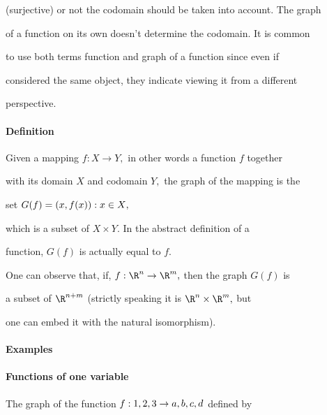 (surjective) or not the codomain should be taken into account. The graph

of a function on its own doesn't determine the codomain. It is common

to use both terms function and graph of a function since even if

considered the same object, they indicate viewing it from a different

perspective.






\paragraph{Definition}



Given a mapping $f : X \to Y,$ in other words a function $f$ together

with its domain $X$ and codomain $Y,$ the graph of the mapping is the

set $G(f) = \\{(x,f(x)) : x \in X\\},$



which is a subset of $X\times Y$. In the abstract definition of a

function, $G(f)$ is actually equal to $f.$



One can observe that, if, $f : \R^n \to \R^m,$ then the graph $G(f)$ is

a subset of $\R^{n+m}$ (strictly speaking it is $\R^n \times \R^m,$ but

one can embed it with the natural isomorphism).



\paragraph{Examples}



\paragraph{Functions of one variable}



The graph of the function $f : \\{1,2,3\\} \to \\{a,b,c,d\\}$ defined by



